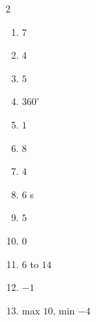 \documentclass[11pt]{article}
\begin{document}
\begin{keybox}
\begin{multicols}{2}
\small
\begin{enumerate}[leftmargin=*,itemsep=3pt]
  \item $7$
  \item $4$
  \item $5$
  \item $360^\circ$
  \item $1$
  \item $8$
  \item $4$
  \item $6$ s
  \item $5$
  \item $0$
  \item $6$ to $14$
  \item $-1$
  \item max $10$, min $-4$
\end{enumerate}
\end{multicols}
\end{keybox}
\end{document}
